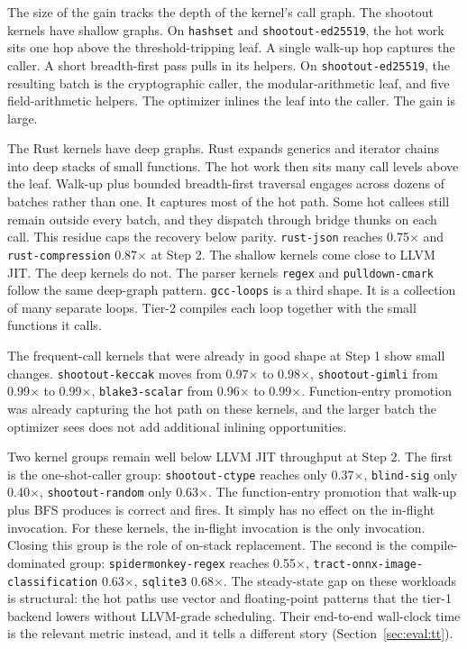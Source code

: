 The size of the gain tracks the depth of the kernel's call graph. The shootout kernels have shallow graphs. On \texttt{hashset} and \texttt{shootout-ed25519}, the hot work sits one hop above the threshold-tripping leaf. A single walk-up hop captures the caller. A short breadth-first pass pulls in its helpers. On \texttt{shootout-ed25519}, the resulting batch is the cryptographic caller, the modular-arithmetic leaf, and five field-arithmetic helpers. The optimizer inlines the leaf into the caller. The gain is large.

The Rust kernels have deep graphs. Rust expands generics and iterator chains into deep stacks of small functions. The hot work then sits many call levels above the leaf. Walk-up plus bounded breadth-first traversal engages across dozens of batches rather than one. It captures most of the hot path. Some hot callees still remain outside every batch, and they dispatch through bridge thunks on each call. This residue caps the recovery below parity. \texttt{rust-json} reaches 0.75$\times$ and \texttt{rust-compression} 0.87$\times$ at Step 2. The shallow kernels come close to LLVM JIT. The deep kernels do not. The parser kernels \texttt{regex} and \texttt{pulldown-cmark} follow the same deep-graph pattern. \texttt{gcc-loops} is a third shape. It is a collection of many separate loops. Tier-2 compiles each loop together with the small functions it calls.

The frequent-call kernels that were already in good shape at Step 1 show small changes. \texttt{shootout-keccak} moves from 0.97$\times$ to 0.98$\times$, \texttt{shootout-gimli} from 0.99$\times$ to 0.99$\times$, \texttt{blake3-scalar} from 0.96$\times$ to 0.99$\times$. Function-entry promotion was already capturing the hot path on these kernels, and the larger batch the optimizer sees does not add additional inlining opportunities.

Two kernel groups remain well below LLVM JIT throughput at Step 2. The first is the one-shot-caller group: \texttt{shootout-ctype} reaches only 0.37$\times$, \texttt{blind-sig} only 0.40$\times$, \texttt{shootout-random} only 0.63$\times$. The function-entry promotion that walk-up plus BFS produces is correct and fires. It simply has no effect on the in-flight invocation. For these kernels, the in-flight invocation is the only invocation. Closing this group is the role of on-stack replacement. The second is the compile-dominated group: \texttt{spidermonkey-regex} reaches 0.55$\times$, \texttt{tract-onnx-image-classification} 0.63$\times$, \texttt{sqlite3} 0.68$\times$. The steady-state gap on these workloads is structural: the hot paths use vector and floating-point patterns that the tier-1 backend lowers without LLVM-grade scheduling. Their end-to-end wall-clock time is the relevant metric instead, and it tells a different story (Section~\ref{sec:eval:tt}).


